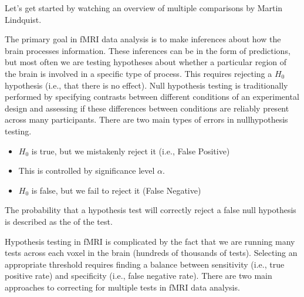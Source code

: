 \documentclass[letterpaper,10pt,english]{sphinxmanual}
\begin{document}
Let’s get started by watching an overview of multiple comparisons by Martin Lindquist.

\begin{sphinxVerbatim}[commandchars=\\\{\}]
   

\end{sphinxVerbatim}

\noindent{}

The primary goal in fMRI data analysis is to make inferences about how the brain processes information. These inferences can be in the form of predictions, but most often we are testing hypotheses about whether a particular region of the brain is involved in a specific type of process. This requires rejecting a \(H_0\) hypothesis (i.e., that there is no effect). Null hypothesis testing is traditionally performed by specifying contrasts between different conditions of an experimental design and assessing if these differences between conditions are reliably present across many participants. There are two main types of errors in null\sphinxhyphen{}hypothesis testing.

\begin{itemize}
\item {} 
\(H_0\) is true, but we mistakenly reject it (i.e., False Positive)

\item {} 
This is controlled by significance level \(\alpha\).

\end{itemize}

\begin{itemize}
\item {} 
\(H_0\) is false, but we fail to reject it (False Negative)

\end{itemize}

The probability that a hypothesis test will correctly reject a false null hypothesis is described as the  of the test.

Hypothesis testing in fMRI is complicated by the fact that we are running many tests across each voxel in the brain (hundreds of thousands of tests). Selecting an appropriate threshold requires finding a balance between sensitivity (i.e., true positive rate) and specificity (i.e., false negative rate). There are two main approaches to correcting for multiple tests in fMRI data analysis.
\end{document}
